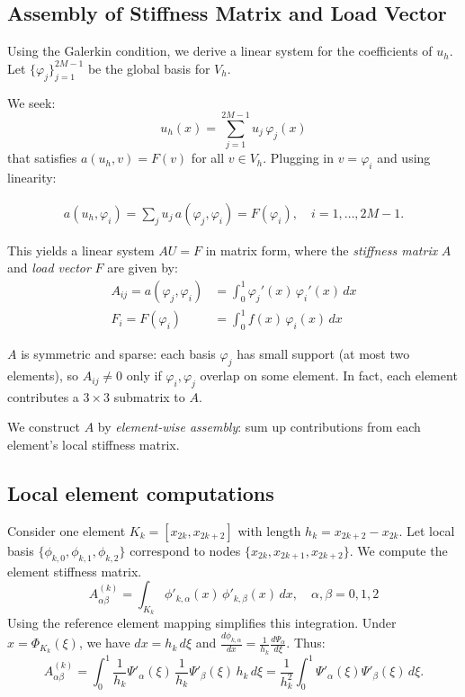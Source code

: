 \documentclass[a4paper,10pt]{report}
\begin{document}
\subsection*{Assembly of Stiffness Matrix and Load Vector}
Using the Galerkin condition, we derive a linear system for the coefficients of \(u_h\).
Let \(\{ \varphi_j \}_{j=1}^{2M-1} \) be the global basis for \(V_h\).

We seek:
\[
	u_h(x) = \sum_{j=1}^{2M-1} u_j\, \varphi_j(x)
\]
that satisfies \(a(u_h,v) = F(v)\) for all \(v \in V_h\).
Plugging in \(v = \varphi_i\) and using linearity:

\begin{align*}
	a(u_h,\varphi_i) = \sum_{j} u_j\, a(\varphi_j,\varphi_i) = F(\varphi_i), \quad i=1,\dots,2M-1.
\end{align*}

This yields a linear system \(AU = F\) in matrix form, where the \emph{stiffness matrix} \(A\) and \emph{load vector} \(F\) are given by:
\begin{align*}
	A_{ij}  = a(\varphi_j,\varphi_i) & = \int_0^1 \varphi_j'(x)\,\varphi_i'(x)\,dx \\
	F_i     = F(\varphi_i)           & = \int_0^1 f(x)\,\varphi_i(x)\,dx
\end{align*}

\(A\) is symmetric and sparse: each basis \(\varphi_j\) has small support (at most two elements), so \(A_{ij}\neq 0\) only if \(\varphi_i, \varphi_j\) overlap on some element. 
In fact, each element contributes a \(3\times 3\) submatrix to \(A\).

We construct \(A\) by \emph{element-wise assembly}: sum up contributions from each element's local stiffness matrix.

\subsection*{Local element computations}
Consider one element \(K_k = [x_{2k}, x_{2k+2}]\) with length \(h_k = x_{2k+2}-x_{2k}\).
Let local basis \(\{\phi_{k,0},\phi_{k,1},\phi_{k,2}\}\) correspond to nodes \(\{x_{2k}, x_{2k+1}, x_{2k+2}\}\).
We compute the element stiffness matrix.
\[
A^{(k)}_{\alpha\beta} = \int_{K_k} \phi'_{k,\alpha}(x)\,\phi'_{k,\beta}(x)\,dx, \quad \alpha,\beta=0,1,2
\]
Using the reference element mapping simplifies this integration.
Under \(x = \Phi_{K_k}(\xi)\), we have \(dx = h_k\,d\xi\) and \(\frac{d\phi_{k,\alpha}}{dx} = \frac{1}{h_k}\frac{d\Psi_\alpha}{d\xi}\).
Thus:
\[
A^{(k)}_{\alpha\beta} 
= \int_{0}^{1} \frac{1}{h_k}\Psi'_{\alpha}(\xi)\,\frac{1}{h_k}\Psi'_{\beta}(\xi) \,h_k\,d\xi 
= \frac{1}{h_k^2}\int_{0}^{1} \Psi'_{\alpha}(\xi)\Psi'_{\beta}(\xi)\,d\xi.
\]
\end{document}

